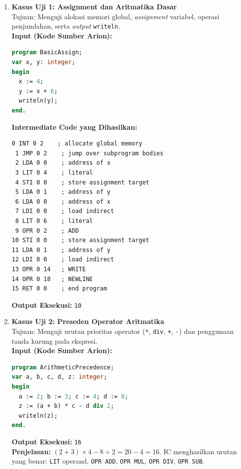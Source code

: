\documentclass[12pt, a4paper]{article}
\begin{document}
\begin{enumerate}

    \item \textbf{Kasus Uji 1: Assignment dan Aritmatika Dasar} \\
    Tujuan: Menguji alokasi memori global, \textit{assignment} variabel, operasi penjumlahan, serta \textit{output} \texttt{writeln}. \\
    \vspace{0.2cm}
    \textbf{Input (Kode Sumber Arion):}
\begin{lstlisting}[language=Pascal]
program BasicAssign;
var x, y: integer;
begin
  x := 4;
  y := x + 6;
  writeln(y);
end.
\end{lstlisting}
    \textbf{Intermediate Code yang Dihasilkan:}
\begin{lstlisting}[language={},numbers=none,basicstyle=\ttfamily\footnotesize]
 0 INT 0 2    ; allocate global memory
 1 JMP 0 2    ; jump over subprogram bodies
 2 LDA 0 0    ; address of x
 3 LIT 0 4    ; literal
 4 STI 0 0    ; store assignment target
 5 LDA 0 1    ; address of y
 6 LDA 0 0    ; address of x
 7 LDI 0 0    ; load indirect
 8 LIT 0 6    ; literal
 9 OPR 0 2    ; ADD
10 STI 0 0    ; store assignment target
11 LDA 0 1    ; address of y
12 LDI 0 0    ; load indirect
13 OPR 0 14   ; WRITE
14 OPR 0 18   ; NEWLINE
15 RET 0 0    ; end program
\end{lstlisting}
    \textbf{Output Eksekusi:} \texttt{10}
    \vspace{0.5cm}

    \item \textbf{Kasus Uji 2: Preseden Operator Aritmatika} \\
    Tujuan: Menguji urutan prioritas operator (\texttt{*}, \texttt{div}, \texttt{+}, \texttt{-}) dan penggunaan tanda kurung pada ekspresi. \\
    \vspace{0.2cm}
    \textbf{Input (Kode Sumber Arion):}
\begin{lstlisting}[language=Pascal]
program ArithmeticPrecedence;
var a, b, c, d, z: integer;
begin
  a := 2; b := 3; c := 4; d := 8;
  z := (a + b) * c - d div 2;
  writeln(z);
end.
\end{lstlisting}
    \textbf{Output Eksekusi:} \texttt{16} \\
    \textbf{Penjelasan:} $(2+3) \times 4 - 8 \div 2 = 20 - 4 = 16$. IC menghasilkan urutan yang benar: \texttt{LIT} operand, \texttt{OPR ADD}, \texttt{OPR MUL}, \texttt{OPR DIV}, \texttt{OPR SUB}.
    \vspace{0.5cm}


\end{enumerate}
\end{document}
